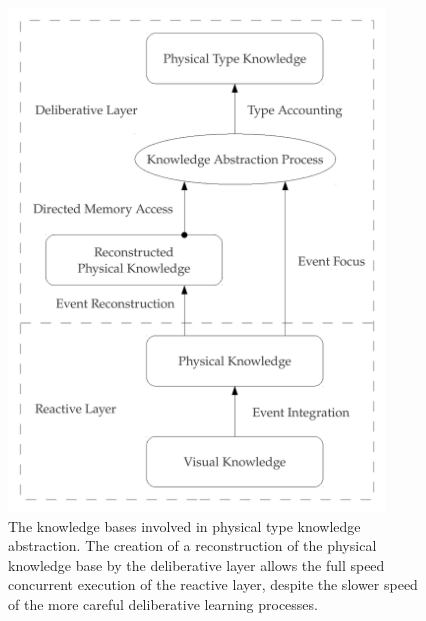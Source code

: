 \begin{figure}
\begin{center}
\includegraphics[width=10cm]{gfx/physical_type_knowledge_abstraction}
\end{center}
\caption[The knowledge bases involved in physical type knowledge
  abstraction.]{The knowledge bases involved in physical type
  knowledge abstraction.  The creation of a reconstruction of the
  physical knowledge base by the deliberative layer allows the full
  speed concurrent execution of the reactive layer, despite the slower
  speed of the more careful deliberative learning processes.}
\label{figure:physical_type_knowledge_abstraction}
\end{figure}

